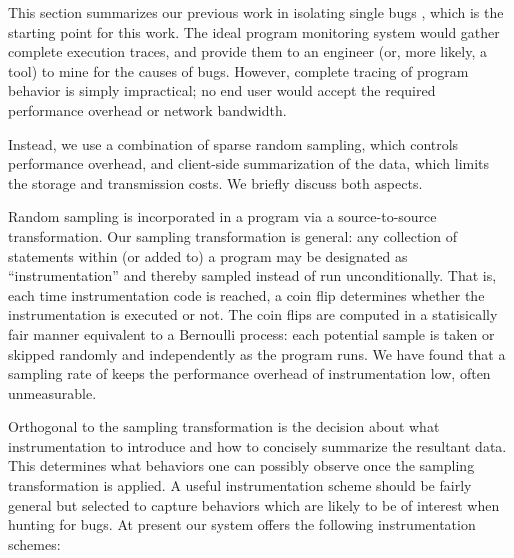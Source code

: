 \documentclass{sig-alternate}
\begin{document}
This section summarizes our previous work in isolating single bugs
\cite{PLDI`03*141,Zheng:2003:SDSP}, which is the starting point for
this work.  The ideal program monitoring system would gather complete
execution traces, and provide them to an engineer (or, more likely, a
tool) to mine for the causes of bugs.  However, complete tracing of
program behavior is simply impractical; no end user would accept the
required performance overhead or network bandwidth.

Instead, we use a combination of sparse random sampling, which controls
performance overhead, and client-side summarization of the data, which
limits the storage and transmission costs.  We briefly discuss
both aspects.

Random sampling is incorporated in a program via a source-to-source transformation.
Our sampling transformation is general: any collection of
statements within (or added to) a program may be designated as
``instrumentation'' and thereby sampled instead of run
unconditionally.  That is, each time instrumentation code is reached,
a coin flip determines whether the instrumentation is executed or not.
The coin flips are computed in a statisically fair
manner equivalent to a Bernoulli process: each potential sample is
taken or skipped randomly and independently as the program runs.
We have found that a sampling rate of  keeps the performance overhead
of instrumentation low, often unmeasurable.

Orthogonal to the sampling transformation is the decision about what
instrumentation to introduce and how to concisely
summarize the resultant data.  This determines what behaviors one can
possibly observe once the sampling transformation is applied.  A useful instrumentation
scheme should be fairly general but selected to capture behaviors
which are likely to be of interest when hunting for bugs.  At present
our system offers the following instrumentation schemes:
\end{document}
